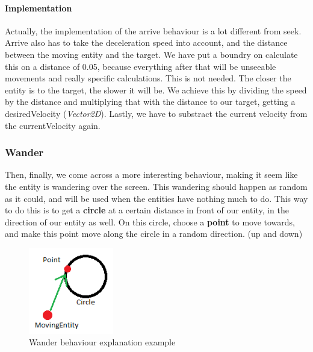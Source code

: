 \documentclass[11pt]{extarticle}
\begin{document}
    \paragraph{Implementation}
    Actually, the implementation of the arrive behaviour is a lot different from seek.
    Arrive also has to take the deceleration speed into account, and the distance between the moving entity and the target.
    We have put a boundry on calculate this on a distance of 0.05, because everything after that will be unseeable movements and really specific calculations.
    This is not needed.
    The closer the entity is to the target, the slower it will be.
    We achieve this by dividing the speed by the distance and multiplying that with the distance to our target, getting a desiredVelocity (\textit{Vector2D}).
    Lastly, we have to substract the current velocity from the currentVelocity again.
    
    \subsubsection{Wander}
    Then, finally, we come across a more interesting behaviour, making it seem like the entity is wandering over the screen.
    This wandering should happen as random as it could, and will be used when the entities have nothing much to do.
    This way to do this is to get a \textbf{circle} at a certain distance in front of our entity, in the direction of our entity as well.
    On this circle, choose a \textbf{point} to move towards, and make this point move along the circle in a random direction. (up and down)

    \begin{figure}[h!]
        \begin{center}
        \includegraphics[width=10em]{WanderBehaviour.png}
        \end{center}
        \caption{Wander behaviour explanation example}

        \label{fig:WanderBehaviourExplanation}
    \end{figure}
    
\end{document}
